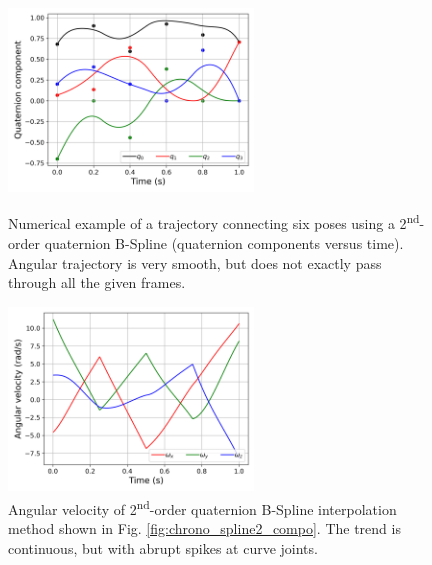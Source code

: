 \begin{figure}[tbp]
    \begin{minipage}[t]{0.49\textwidth}
        \centering
        \includegraphics[width=6.5cm]{figures/chrono_spline2_compo.png}
        \caption{Numerical example of a trajectory connecting six poses using a 2\textsuperscript{nd}-order quaternion B-Spline (quaternion components versus time). Angular trajectory is very smooth, but does not exactly pass through all the given frames.}
        \label{fig:chrono_spline2_compo}
    \end{minipage}
    \hfill
    \begin{minipage}[t]{0.49\textwidth}
        \centering
        \includegraphics[width=6.5cm]{figures/chrono_spline2_vel.png}
        \caption{Angular velocity of 2\textsuperscript{nd}-order quaternion B-Spline interpolation method shown in Fig. \ref{fig:chrono_spline2_compo}. The trend is continuous, but with abrupt spikes at curve joints.}
        \label{fig:chrono_spline2_vel}
    \end{minipage}
\end{figure}

